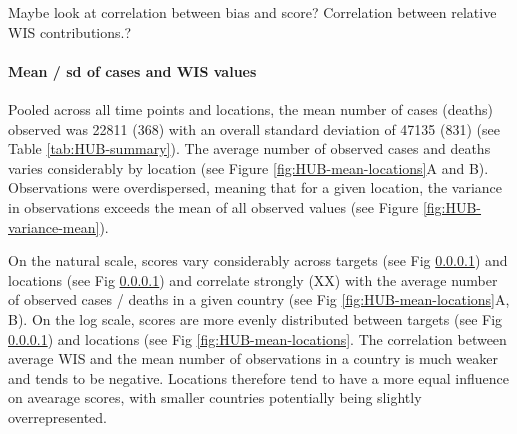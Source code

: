 \documentclass{article}
\begin{document}
Maybe look at correlation between bias and score?
Correlation between relative WIS contributions.?

\paragraph{Mean / sd of cases and WIS values}
Pooled across all time points and locations, the mean number of cases (deaths) observed was 22811 (368) with an overall standard deviation of 47135 (831) (see Table \ref{tab:HUB-summary}). The average number of observed cases and deaths varies considerably by location (see Figure \ref{fig:HUB-mean-locations}A and B). Observations were overdispersed, meaning that for a given location, the variance in observations exceeds the mean of all observed values (see Figure \ref{fig:HUB-variance-mean}). 

On the natural scale, scores vary considerably across targets (see Fig \ref{}) and locations (see Fig \ref{}) and correlate strongly (XX) with the average number of observed cases / deaths in a given country (see Fig \ref{fig:HUB-mean-locations}A, B). On the log scale, scores are more evenly distributed between targets (see Fig \ref{}) and locations (see Fig \ref{fig:HUB-mean-locations}. The correlation between average WIS and the mean number of observations in a country is much weaker and tends to be negative. Locations therefore tend to have a more equal influence on avearage scores, with smaller countries potentially being slightly overrepresented. 


\end{document}
